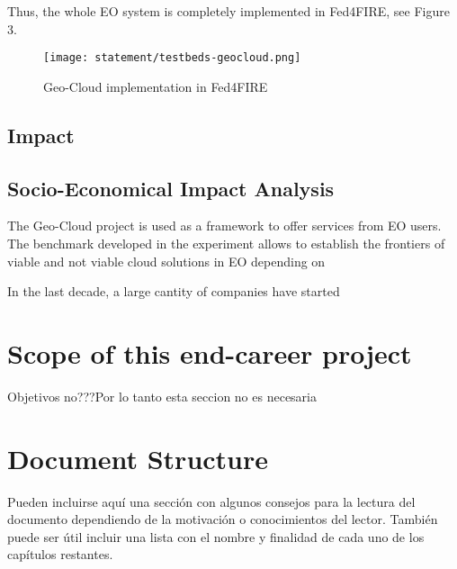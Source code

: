 \begin{enumerate}
Thus, the whole EO system is completely implemented in Fed4FIRE, see Figure 3. 

\begin{figure}[!h]
\begin{center}
\texttt{[image: statement/testbeds-geocloud.png]}
\caption{Geo-Cloud implementation in Fed4FIRE}
\label{fig:intr-testbeds-geocloud}
\end{center}
\end{figure}


\subsection{Impact}

\subsection{Socio-Economical Impact Analysis}

The Geo-Cloud project is used as a framework to offer services from EO
users. The benchmark developed in the experiment allows to establish the
frontiers of viable and not viable cloud solutions in EO depending on  

In the last decade, a large cantity of companies have started 


\section{Scope of this end-career project}
Objetivos no???Por lo tanto esta seccion no es necesaria



\section{Document Structure}

Pueden incluirse aquí una sección con algunos consejos para la lectura del
documento dependiendo de la motivación o conocimientos del lector.  También
puede ser útil incluir una lista con el nombre y finalidad de cada uno de los
capítulos restantes.



\end{enumerate}
